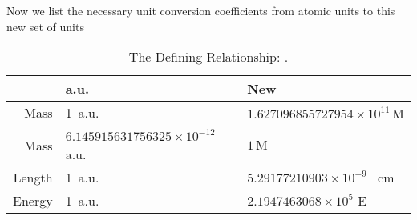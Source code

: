 \documentclass{article}
\begin{document}
Now we list the necessary unit conversion coefficients from atomic units to this new set of units
\begin{table}[H]
	\centering
	\begin{threeparttable}
		\begin{tabular}{rll}
			\toprule
			& a.u.                                   & New                                           \\
			\midrule
			Mass & 1\, a.u.                       & $1.627096855727954\times10^{11} \mathrm{\,M}$ \\
			Mass & $6.145915631756325\times10^{-12}$\, a.u.   & $1\,\mathrm{M}$                                \\
			Length& 1\, a.u.                      & $5.29177210903\times 10^{-9}$ \SI{}{\centi\meter} \\
			Energy& 1\, a.u.                      & $2.1947463068\times10^5$ E \\
			\bottomrule
		\end{tabular}
		\caption{The Defining Relationship: .}
	\end{threeparttable}
\end{table}
\end{document}
